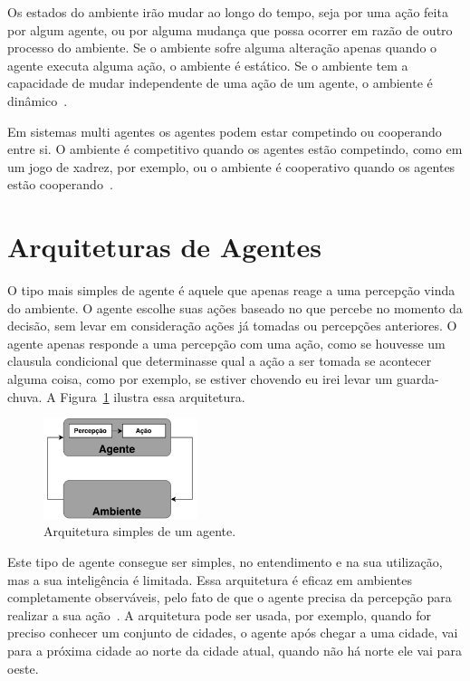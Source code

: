 Os estados do ambiente irão mudar ao longo do tempo, seja por uma ação feita por algum agente, ou por alguma mudança que possa ocorrer em razão de outro processo do ambiente. Se o ambiente sofre alguma alteração apenas quando o agente executa alguma ação, o ambiente é estático. Se o ambiente tem a capacidade de mudar independente de uma ação de um agente, o ambiente é dinâmico~\cite{agent1999}.

Em sistemas multi agentes os agentes podem estar competindo ou cooperando entre si. O ambiente é competitivo quando os agentes estão competindo, como em um jogo de xadrez, por exemplo, ou o ambiente é cooperativo quando os agentes estão cooperando~\cite[Capítulo 2]{intelligence2003modern}.

\section{Arquiteturas de Agentes}


O tipo mais simples de agente é aquele que apenas reage a uma percepção vinda do ambiente. O agente escolhe suas ações baseado no que percebe no momento da decisão, sem levar em consideração ações já tomadas ou percepções anteriores. O agente apenas responde a uma percepção com uma ação, como se houvesse um clausula condicional que determinasse qual a ação a ser tomada se acontecer alguma coisa, como por exemplo, se estiver chovendo eu irei levar um guarda-chuva. A Figura~\ref{fig:agenteSimple} ilustra essa arquitetura. 

\begin{figure}[ht]
	\centering
	\includegraphics[width=0.4\textwidth]{fig/agentSimple.pdf}
	\caption{Arquitetura simples de um agente.}
	\label{fig:agenteSimple}
\end{figure} 


Este tipo de agente consegue ser simples, no entendimento e na sua utilização, mas a sua inteligência é limitada. Essa arquitetura é eficaz em ambientes completamente observáveis, pelo fato de que o agente precisa da percepção para realizar a sua ação~\cite[Capítulo 7]{intelligence2003modern}. A arquitetura pode ser usada, por exemplo, quando for preciso conhecer um conjunto de cidades, o agente após chegar a uma cidade, vai para a próxima cidade ao norte da cidade atual, quando não há norte ele vai para oeste. 

